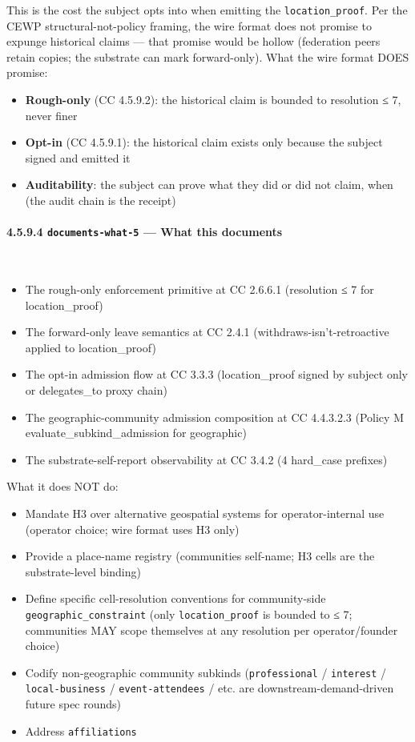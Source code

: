 \documentclass[11pt]{article}
\begin{document}
This is the cost the subject opts into when emitting the \texttt{location\_proof}. Per the CEWP structural-not-policy framing, the wire format does not promise to expunge historical claims — that promise would be hollow (federation peers retain copies; the substrate can mark forward-only). What the wire format DOES promise:


\begin{itemize}\setlength\itemsep{0pt}
\item \textbf{Rough-only} (CC 4.5.9.2): the historical claim is bounded to resolution ≤ 7, never finer
\item \textbf{Opt-in} (CC 4.5.9.1): the historical claim exists only because the subject signed and emitted it
\item \textbf{Auditability}: the subject can prove what they did or did not claim, when (the audit chain is the receipt)
\end{itemize}


\paragraph{4.5.9.4 \texttt{documents-what-5} — What this documents}\mbox{}\\


\begin{itemize}\setlength\itemsep{0pt}
\item The rough-only enforcement primitive at CC 2.6.6.1 (resolution ≤ 7 for location\_proof)
\item The forward-only leave semantics at CC 2.4.1 (withdraws-isn't-retroactive applied to location\_proof)
\item The opt-in admission flow at CC 3.3.3 (location\_proof signed by subject only or delegates\_to proxy chain)
\item The geographic-community admission composition at CC 4.4.3.2.3 (Policy M evaluate\_subkind\_admission for geographic)
\item The substrate-self-report observability at CC 3.4.2 (4 hard\_case prefixes)
\end{itemize}


What it does NOT do:

\begin{itemize}\setlength\itemsep{0pt}
\item Mandate H3 over alternative geospatial systems for operator-internal use (operator choice; wire format uses H3 only)
\item Provide a place-name registry (communities self-name; H3 cells are the substrate-level binding)
\item Define specific cell-resolution conventions for community-side \texttt{geographic\_constraint} (only \texttt{location\_proof} is bounded to ≤ 7; communities MAY scope themselves at any resolution per operator/founder choice)
\item Codify non-geographic community subkinds (\texttt{professional} / \texttt{interest} / \texttt{local-business} / \texttt{event-attendees} / etc. are downstream-demand-driven future spec rounds)
\item Address \texttt{affiliations}
\end{itemize}
\end{document}
